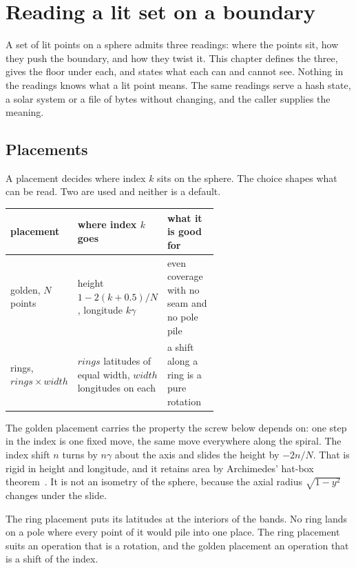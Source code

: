 \chapter{Reading a lit set on a boundary}

A set of lit points on a sphere admits three readings: where the points sit, how they push the boundary, and how they twist it. This chapter defines the three, gives the floor under each, and states what each can and cannot see. Nothing in the readings knows what a lit point means. The same readings serve a hash state, a solar system or a file of bytes without changing, and the caller supplies the meaning.

\section{Placements}

A placement decides where index \(k\) sits on the sphere. The choice shapes what can be read. Two are used and neither is a default.

\begin{center}
\begin{tabular}{@{}lp{0.3\linewidth}p{0.3\linewidth}@{}}
\toprule
placement & where index \(k\) goes & what it is good for \\
\midrule
golden, \(N\) points & height \(1 - 2(k+0.5)/N\), longitude \(k\gamma\)~\cite[Corollary~2]{src:Swierczkowski-1958} & even coverage with no seam and no pole pile~\cite{src:Gonzalez-2010} \\
rings, \(\mathit{rings} \times \mathit{width}\) & \(\mathit{rings}\) latitudes of equal width, \(\mathit{width}\) longitudes on each & a shift along a ring is a pure rotation \\
\bottomrule
\end{tabular}
\end{center}

The golden placement carries the property the screw below depends on: one step in the index is one fixed move, the same move everywhere along the spiral. The index shift \(n\) turns by \(n\gamma\) about the axis and slides the height by \(-2n/N\). That is rigid in height and longitude, and it retains area by Archimedes' hat-box theorem~\cite[\emph{On the Sphere and Cylinder} I, Propositions 33, 42 and 43]{src:Heath-1897}. It is not an isometry of the sphere, because the axial radius \(\sqrt{1 - y^2}\) changes under the slide.

The ring placement puts its latitudes at the interiors of the bands. No ring lands on a pole where every point of it would pile into one place. The ring placement suits an operation that is a rotation, and the golden placement an operation that is a shift of the index.

